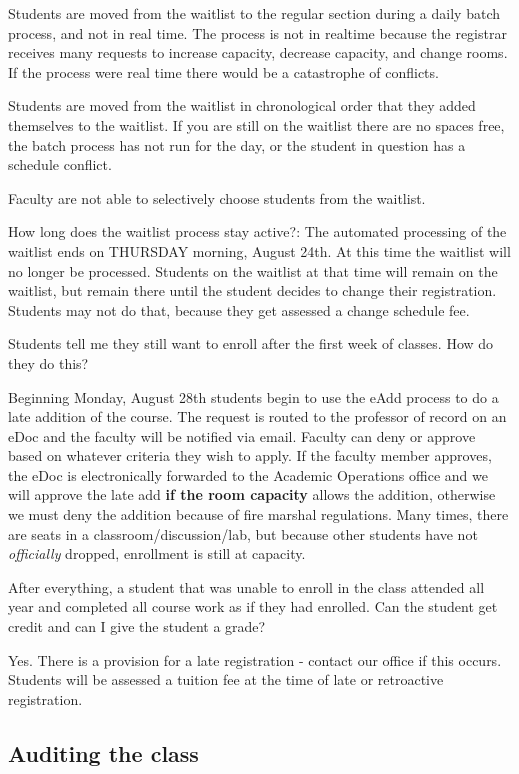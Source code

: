 Students are moved from the waitlist to the regular section during a
daily batch process, and not in real time. The process is not in
realtime because the registrar receives many requests to increase
capacity, decrease capacity, and change rooms. If the process were real
time there would be a catastrophe of conflicts.

Students are moved from the waitlist in chronological order that they
added themselves to the waitlist. If you are still on the waitlist there
are no spaces free, the batch process has not run for the day, or the
student in question has a schedule conflict.

Faculty are not able to selectively choose students from the waitlist.

How long does the waitlist process stay active?: The automated
processing of the waitlist ends on THURSDAY morning, August 24th. At
this time the waitlist will no longer be processed. Students on the
waitlist at that time will remain on the waitlist, but remain there
until the student decides to change their registration. Students may not
do that, because they get assessed a change schedule fee.

Students tell me they still want to enroll after the first week of
classes. How do they do this?

Beginning Monday, August 28th students begin to use the eAdd process to
do a late addition of the course. The request is routed to the professor
of record on an eDoc and the faculty will be notified via email. Faculty
can deny or approve based on whatever criteria they wish to apply. If
the faculty member approves, the eDoc is electronically forwarded to the
Academic Operations office and we will approve the late add \textbf{if
the room capacity} allows the addition, otherwise we must deny the
addition because of fire marshal regulations. Many times, there are
seats in a classroom/discussion/lab, but because other students have not
\emph{officially} dropped, enrollment is still at capacity.

After everything, a student that was unable to enroll in the class
attended all year and completed all course work as if they had enrolled.
Can the student get credit and can I give the student a grade?

Yes. There is a provision for a late registration - contact our office
if this occurs. Students will be assessed a tuition fee at the time of
late or retroactive registration.

\subsection{Auditing the class}\label{auditing-the-class}

